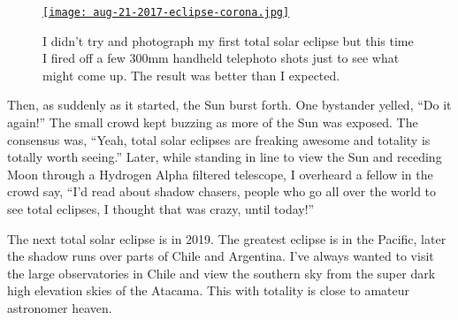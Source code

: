 %

 \begin{SCfigure} 
 \centering
\href{https://conceptcontrol.smugmug.com/Places/USA-and-Canada/Idaho-Instants/i-25dfJkS/A}{\texttt{[image: aug-21-2017-eclipse-corona.jpg]}}
 \caption{I didn't try and photograph my first total solar eclipse but this time I
fired off a few 300mm handheld telephoto shots just to see what might
come up. The result was better than I expected.}
 \label{fig:5340x5}
 \end{SCfigure}


Then, as suddenly as it started, the Sun burst forth. One bystander
yelled, ``Do it again!'' The small crowd kept buzzing as more of the Sun
was exposed. The consensus was, ``Yeah, total solar eclipses are
freaking awesome and totality is totally worth seeing.'' Later, while
standing in line to view the Sun and receding Moon through a Hydrogen
Alpha filtered telescope, I overheard a fellow in the crowd say, ``I'd
read about shadow chasers, people who go all over the world to see total
eclipses, I thought that was crazy, until today!''

The next total solar eclipse is in 2019. The greatest eclipse is in the
Pacific, later the shadow runs over parts of Chile and Argentina. I've
always wanted to visit the large observatories in Chile and view the
southern sky from the super dark high elevation skies of the Atacama.
This with totality is close to amateur astronomer heaven.



